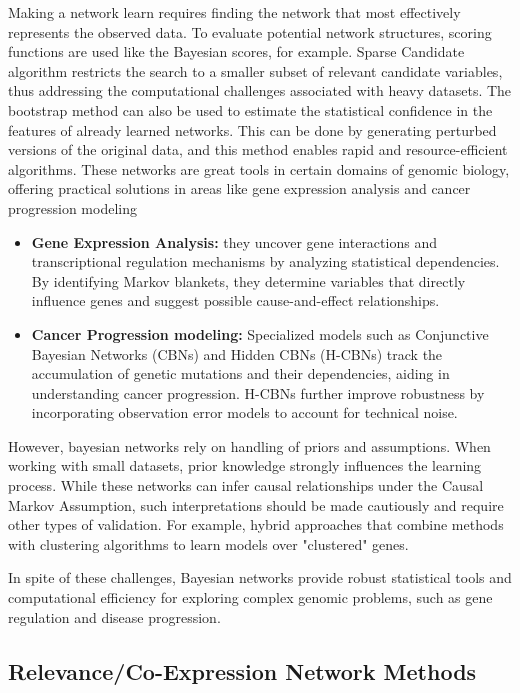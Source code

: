 Making a network learn requires finding the network that most effectively represents the observed data.
To evaluate potential network structures, scoring functions are used like the Bayesian scores, for example.
Sparse Candidate algorithm restricts the search to a smaller subset of relevant candidate variables, thus addressing the computational challenges associated with heavy datasets.
The bootstrap method can also be used to estimate the statistical confidence in the features of already learned networks.
This can be done by generating perturbed versions of the original data, and this method enables rapid and resource-efficient algorithms\cite{friedman_using_2000}.
\newpage
These networks are great tools in certain domains of genomic biology, offering practical solutions in areas like gene expression analysis and cancer progression modeling
\begin{itemize}
    \item \textbf{Gene Expression Analysis:} they uncover gene interactions and transcriptional regulation mechanisms by analyzing statistical dependencies.
        By identifying Markov blankets, they determine variables that directly influence genes and suggest possible cause-and-effect relationships.
    \item \textbf{Cancer Progression modeling:} Specialized models such as Conjunctive Bayesian Networks (CBNs) and Hidden CBNs (H-CBNs) track the accumulation of genetic mutations and their dependencies, aiding in understanding cancer progression.
        H-CBNs further improve robustness by incorporating observation error models to account for technical noise.
\end{itemize}

\noindent However, bayesian networks rely on handling of priors and assumptions.
When working with small datasets, prior knowledge strongly influences the learning process.
While these networks can infer causal relationships under the Causal Markov Assumption, such interpretations should be made cautiously and require other types of validation.
For example, hybrid approaches that combine methods with clustering algorithms to learn models over "clustered" genes\cite{friedman_using_2000}.

\noindent In spite of these challenges, Bayesian networks provide robust statistical tools and computational efficiency for exploring complex genomic problems, such as gene regulation and disease progression.


\subsection{Relevance/Co-Expression Network Methods}\label{subsec:relevance-co-expression-network-methods}

